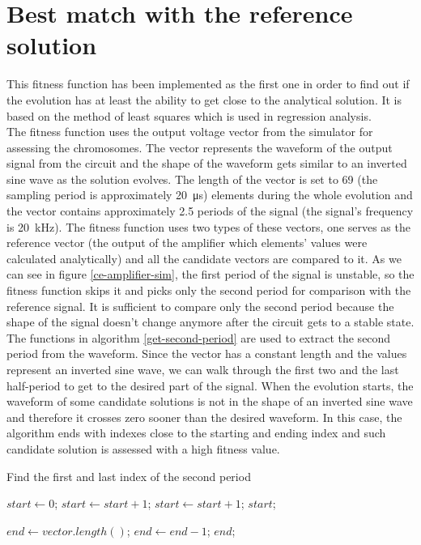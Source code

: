 \section{Best match with the reference solution}
This fitness function has been implemented as the first one in order to find out if the evolution has at least the ability to get close to the analytical solution. It is based on the method of least squares which is used in regression analysis.\\
    The fitness function uses the output voltage vector from the simulator for assessing the chromosomes. The vector represents the waveform of the output signal from the circuit and the shape of the waveform gets similar to an inverted sine wave as the solution evolves. The length of the vector is set to 69 (the sampling period is approximately \SI{20}{\micro\second}) elements during the whole evolution and the vector contains approximately 2.5 periods of the signal (the signal's frequency is \SI{20}{\kilo\hertz}). The fitness function uses two types of these vectors, one serves as the reference vector (the output of the amplifier which elements' values were calculated analytically) and all the candidate vectors are compared to it. As we can see in figure \ref{ce-amplifier-sim}, the first period of the signal is unstable, so the fitness function skips it and picks only the second period for comparison with the reference signal. It is sufficient to compare only the second period because the shape of the signal doesn't change anymore after the circuit gets to a stable state.\\
    The functions in algorithm \ref{get-second-period} are used to extract the second period from the waveform. Since the vector has a constant length and the values represent an inverted sine wave, we can walk through the first two and the last half-period to get to the desired part of the signal. When the evolution starts, the waveform of some candidate solutions is not in the shape of an inverted sine wave and therefore it crosses zero sooner than the desired waveform. In this case, the algorithm ends with indexes close to the starting and ending index and such candidate solution is assessed with a high fitness value.

    \begin{algorithm}
    \caption{Find the first and last index of the second period}
    \label{get-second-period}
    \begin{algorithmic}[1]
            \State $start \gets 0$;
                \State $start \gets start + 1$;
            \EndWhile
                \State $start \gets start + 1$;
            \EndWhile
            \State \Return $start$;
        \EndFunction

            \State $end \gets vector.length()$;
                \State $end \gets end - 1$;
            \EndWhile
            \State \Return $end$;
        \EndFunction
    \end{algorithmic}
    \end{algorithm}

